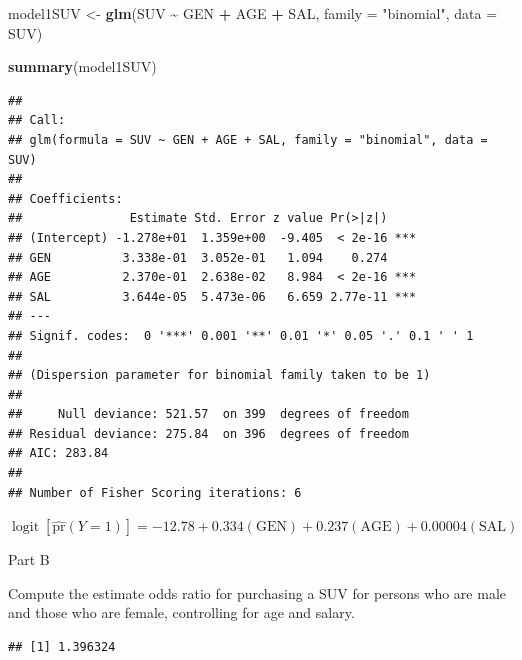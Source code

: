 \documentclass[
]{article}
\newenvironment{Shaded}{\begin{snugshade}}{\end{snugshade}}
\newcommand{\AttributeTok}[1]{\textcolor[rgb]{0.13,0.29,0.53}{#1}}
\newcommand{\FunctionTok}[1]{\textcolor[rgb]{0.13,0.29,0.53}{\textbf{#1}}}
\newcommand{\NormalTok}[1]{#1}
\newcommand{\OtherTok}[1]{\textcolor[rgb]{0.56,0.35,0.01}{#1}}
\newcommand{\SpecialCharTok}[1]{\textcolor[rgb]{0.81,0.36,0.00}{\textbf{#1}}}
\newcommand{\StringTok}[1]{\textcolor[rgb]{0.31,0.60,0.02}{#1}}
\begin{document}
\begin{Shaded}
\begin{Highlighting}[]
\NormalTok{model1SUV }\OtherTok{\textless{}{-}} \FunctionTok{glm}\NormalTok{(SUV }\SpecialCharTok{\textasciitilde{}}\NormalTok{ GEN }\SpecialCharTok{+}\NormalTok{ AGE }\SpecialCharTok{+}\NormalTok{ SAL, }\AttributeTok{family =} \StringTok{"binomial"}\NormalTok{, }\AttributeTok{data =}\NormalTok{ SUV)}

\FunctionTok{summary}\NormalTok{(model1SUV)}
\end{Highlighting}
\end{Shaded}

\begin{verbatim}
## 
## Call:
## glm(formula = SUV ~ GEN + AGE + SAL, family = "binomial", data = SUV)
## 
## Coefficients:
##               Estimate Std. Error z value Pr(>|z|)    
## (Intercept) -1.278e+01  1.359e+00  -9.405  < 2e-16 ***
## GEN          3.338e-01  3.052e-01   1.094    0.274    
## AGE          2.370e-01  2.638e-02   8.984  < 2e-16 ***
## SAL          3.644e-05  5.473e-06   6.659 2.77e-11 ***
## ---
## Signif. codes:  0 '***' 0.001 '**' 0.01 '*' 0.05 '.' 0.1 ' ' 1
## 
## (Dispersion parameter for binomial family taken to be 1)
## 
##     Null deviance: 521.57  on 399  degrees of freedom
## Residual deviance: 275.84  on 396  degrees of freedom
## AIC: 283.84
## 
## Number of Fisher Scoring iterations: 6
\end{verbatim}

\(\operatorname{logit}\left[ \widehat{\text{pr}}\left( Y=1 \right) \right]=-12.78+0.334\left( \text{GEN} \right)+0.237\left( \text{AGE} \right)+0.00004\left( \text{SAL} \right)\)

Part B

Compute the estimate odds ratio for purchasing a SUV for persons who are
male and those who are female, controlling for age and salary.

\begin{Shaded}
\end{Shaded}

\begin{verbatim}
## [1] 1.396324
\end{verbatim}
\end{document}
